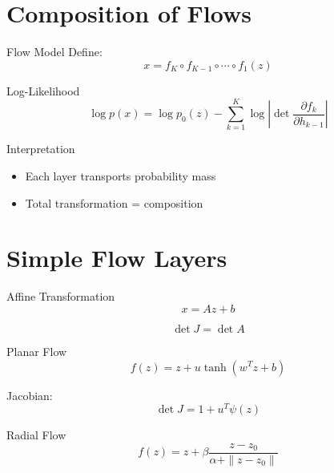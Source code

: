 \documentclass{beamer}
\begin{document}
\section{Composition of Flows}

\begin{frame}{Flow Model}
Define:
\[
x = f_K \circ f_{K-1} \circ \cdots \circ f_1(z)
\]
\end{frame}


\begin{frame}{Log-Likelihood}
\[
\log p(x) = \log p_0(z) - \sum_{k=1}^K \log \left|\det \frac{\partial f_k}{\partial h_{k-1}}\right|
\]
\end{frame}


\begin{frame}{Interpretation}
\begin{itemize}
\item Each layer transports probability mass
\item Total transformation = composition
\end{itemize}
\end{frame}

\section{Simple Flow Layers}

\begin{frame}{Affine Transformation}
\[
x = Az + b
\]

\[
\det J = \det A
\]
\end{frame}


\begin{frame}{Planar Flow}
\[
f(z) = z + u \tanh(w^T z + b)
\]

Jacobian:
\[
\det J = 1 + u^T \psi(z)
\]
\end{frame}


\begin{frame}{Radial Flow}
\[
f(z) = z + \beta \frac{z - z_0}{\alpha + \|z - z_0\|}
\]
\end{frame}
\end{document}

